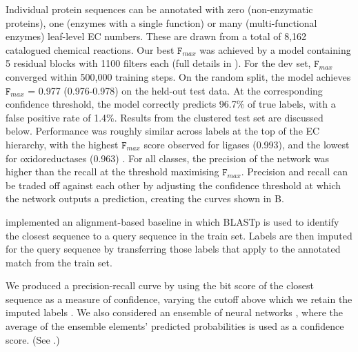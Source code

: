 Individual protein sequences can be annotated with zero (non-enzymatic proteins), one (enzymes with a single function) or many (multi-functional enzymes) leaf-level EC numbers. These are drawn from a total of 8,162 catalogued chemical reactions.
Our best $\texttt{F}_{max}$ was achieved by a model containing 5 residual blocks with 1100 filters each (full details in \textnormal{ \DIFdelbegin {}\DIFdelend \DIFaddbegin {}\DIFaddend }%
). For the dev set, $\texttt{F}_{max}$ converged within 500,000 training steps. On the random split, the model achieves $\texttt{F}_{max}$ = 0.977 (0.976-0.978) on the held-out test data. At the corresponding confidence threshold, the model correctly predicts 96.7\% of true labels, with a false positive rate of 1.4\%. Results from the clustered test set are discussed below.
Performance was roughly similar across labels at the top of the EC hierarchy, with the highest $\texttt{F}_{max}$ score observed for ligases (0.993), and the lowest for oxidoreductases (0.963)\DIFdelbegin \DIFdel{(}%
\DIFdelend . For all classes, the precision of the network was higher than the recall at the threshold maximising $\texttt{F}_{max}$. Precision and recall can be traded off against each other by adjusting the confidence threshold at which the network outputs a prediction, creating the curves shown in B.%


\DIFdelbegin {}\DIFdelend \DIFaddbegin {}\DIFaddend implemented an alignment-based baseline in which BLASTp is used to identify the closest sequence to a query sequence in the train set. Labels are then imputed for the query sequence by transferring those labels that apply to the annotated match from the train set. \DIFdelbegin %

\DIFdelend We produced a precision-recall curve by using the bit score of the closest sequence as a measure of confidence, varying the cutoff above which we retain the imputed labels \cite{zhou2019cafa, eddy2011accelerated}. We also considered an ensemble of neural networks \cite{bileschi}, where the average of the ensemble elements' predicted probabilities is used as a confidence score\DIFaddbegin {}\DIFaddend . %
(See \DIFdelbegin %
\DIFdel{, }%
\DIFdelend \DIFaddbegin {}\DIFadd{, }\DIFaddend .)


